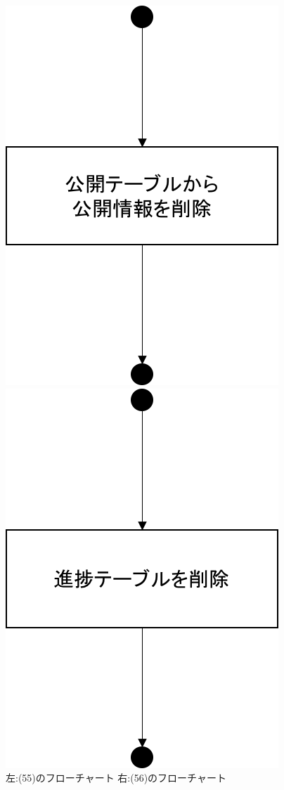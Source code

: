 \begin{figure}[htbp]
 \begin{minipage}{0.5\hsize}
   \begin{center}
   \includegraphics[width=0.5\linewidth,clip]{./img/flow/55.png}
 \end{center}
 \end{minipage}
 \begin{minipage}{0.5\hsize}
   \begin{center}
   \includegraphics[width=0.5\linewidth,clip]{./img/flow/56.png}
   \end{center}
 \end{minipage}
 \caption{左:(55)のフローチャート 右:(56)のフローチャート}\label{fig:54to55to56}
\end{figure}

\clearpage



